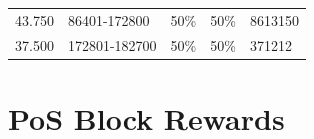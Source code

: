 \documentclass[11pt,a4paperpaper,]{report}
\begin{document}
\begin{longtable}[]{@{}lllcl@{}}
\begin{minipage}[t]{0.16\columnwidth}
43.750\strut
\end{minipage} & \begin{minipage}[t]{0.19\columnwidth}\raggedright\strut
86401-172800\strut
\end{minipage} & \begin{minipage}[t]{0.10\columnwidth}\raggedright\strut
50\%\strut
\end{minipage} & \begin{minipage}[t]{0.10\columnwidth}\centering\strut
50\%\strut
\end{minipage} & \begin{minipage}[t]{0.16\columnwidth}\raggedright\strut
8613150\strut
\end{minipage}\tabularnewline
\begin{minipage}[t]{0.16\columnwidth}\raggedright\strut
37.500\strut
\end{minipage} & \begin{minipage}[t]{0.19\columnwidth}\raggedright\strut
172801-182700\strut
\end{minipage} & \begin{minipage}[t]{0.10\columnwidth}\raggedright\strut
50\%\strut
\end{minipage} & \begin{minipage}[t]{0.10\columnwidth}\centering\strut
50\%\strut
\end{minipage} & \begin{minipage}[t]{0.16\columnwidth}\raggedright\strut
371212\strut
\end{minipage}\tabularnewline
\bottomrule
\end{longtable}

\newpage

\section{PoS Block Rewards}\label{pos-block-rewards}
\end{document}

